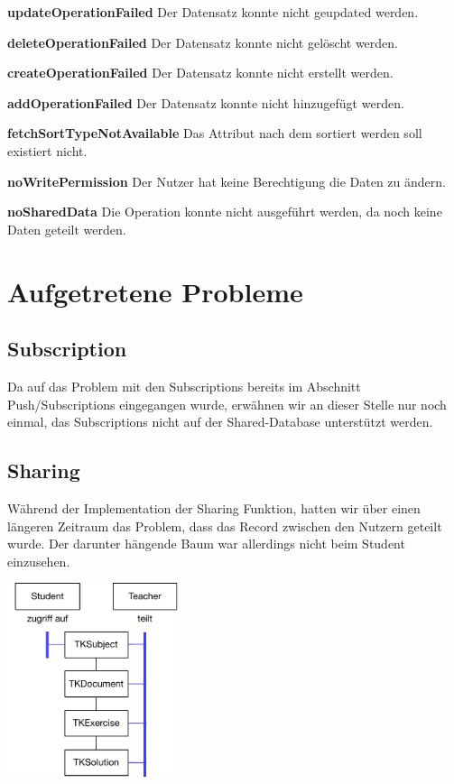 \textbf{updateOperationFailed}
Der Datensatz konnte nicht geupdated werden.

\textbf{deleteOperationFailed}
Der Datensatz konnte nicht gelöscht werden.

\textbf{createOperationFailed}
Der Datensatz konnte nicht erstellt werden.

\textbf{addOperationFailed}
Der Datensatz konnte nicht hinzugefügt werden.

\textbf{fetchSortTypeNotAvailable}
Das Attribut nach dem sortiert werden soll existiert nicht.

\textbf{noWritePermission}
Der Nutzer hat keine Berechtigung die Daten zu ändern.

\textbf{noSharedData}
Die Operation konnte nicht ausgeführt werden, da noch keine Daten geteilt werden.

\newpage

\section{Aufgetretene Probleme}

\subsection{Subscription}
Da auf das Problem mit den Subscriptions bereits im Abschnitt Push/Subscriptions eingegangen wurde, erwähnen wir an dieser Stelle nur noch einmal, das Subscriptions nicht auf der Shared-Database unterstützt werden.


\subsection{Sharing}
Während der Implementation der Sharing Funktion, hatten wir über einen längeren Zeitraum das Problem, dass das Record zwischen den Nutzern geteilt wurde. Der darunter hängende Baum war allerdings nicht beim Student einzusehen.

\begin{center}
   \includegraphics[width=5cm]{images/problemImage.pdf}
\end{center}

